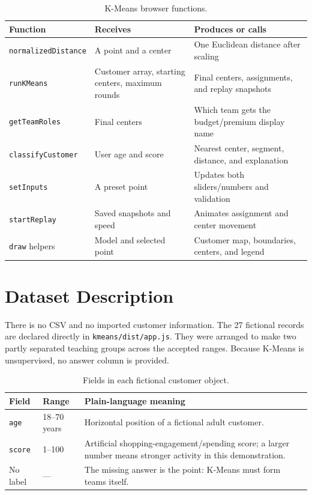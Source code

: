 \documentclass[12pt,a4paper,openany]{report}
\newcommand{\sourcepath}[1]{\texttt{#1}}
\begin{document}
\begin{table}[H]
\centering
\caption{K-Means browser functions.}
\begin{tabularx}{\textwidth}{p{}YY}
\toprule
\textbf{Function} & \textbf{Receives} & \textbf{Produces or calls} \\
\midrule
\texttt{normalizedDistance} & A point and a center & One Euclidean distance after scaling \\
\texttt{runKMeans} & Customer array, starting centers, maximum rounds & Final centers, assignments, and replay snapshots \\
\texttt{getTeamRoles} & Final centers & Which team gets the budget/premium display name \\
\texttt{classifyCustomer} & User age and score & Nearest center, segment, distance, and explanation \\
\texttt{setInputs} & A preset point & Updates both sliders/numbers and validation \\
\texttt{startReplay} & Saved snapshots and speed & Animates assignment and center movement \\
\texttt{draw} helpers & Model and selected point & Customer map, boundaries, centers, and legend \\
\bottomrule
\end{tabularx}
\end{table}

\section{Dataset Description}
There is no CSV and no imported customer information. The 27 fictional records
are declared directly in \sourcepath{kmeans/dist/app.js}. They were arranged to
make two partly separated teaching groups across the accepted ranges. Because
K-Means is unsupervised, no answer column is provided.

\begin{table}[H]
\centering
\caption{Fields in each fictional customer object.}
\begin{tabularx}{\textwidth}{p{}p{}Y}
\toprule
\textbf{Field} & \textbf{Range} & \textbf{Plain-language meaning} \\
\midrule
\texttt{age} & 18--70 years & Horizontal position of a fictional adult customer. \\
\texttt{score} & 1--100 & Artificial shopping-engagement/spending score; a larger number means stronger activity in this demonstration. \\
No label & --- & The missing answer is the point: K-Means must form teams itself. \\
\bottomrule
\end{tabularx}
\end{table}
\end{document}
